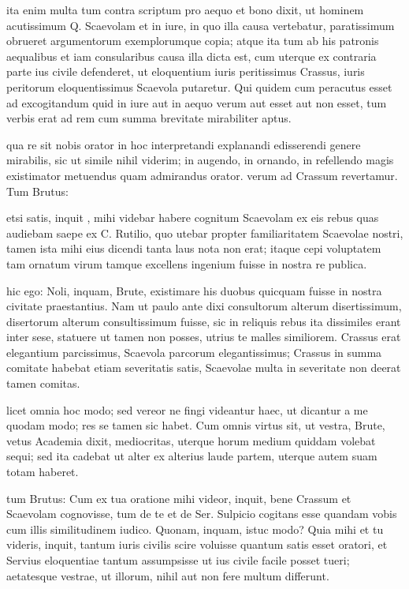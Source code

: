 ita enim multa tum contra scriptum pro aequo et bono dixit, ut hominem acutissimum Q. Scaevolam et in iure, in quo illa causa vertebatur, paratissimum obrueret argumentorum exemplorumque copia; atque ita tum ab his patronis aequalibus et iam consularibus causa illa dicta est, cum uterque ex contraria parte ius civile defenderet, ut eloquentium iuris peritissimus Crassus, iuris peritorum eloquentissimus Scaevola putaretur. Qui quidem cum peracutus esset ad excogitandum quid in iure aut in aequo verum aut esset aut non esset, tum verbis erat ad rem cum summa brevitate mirabiliter aptus.

 qua re sit nobis orator in hoc interpretandi explanandi edisserendi genere mirabilis, sic ut simile nihil viderim; in augendo, in ornando, in refellendo magis existimator metuendus quam admirandus orator. verum ad Crassum revertamur. Tum Brutus:

 etsi satis, inquit , mihi videbar habere cognitum Scaevolam ex eis rebus quas audiebam saepe ex C. Rutilio, quo utebar propter familiaritatem Scaevolae nostri, tamen ista mihi eius dicendi tanta laus nota non erat; itaque cepi voluptatem tam ornatum virum tamque excellens ingenium fuisse in nostra re publica.

 hic ego: Noli, inquam, Brute, existimare his duobus quicquam fuisse in nostra civitate praestantius. Nam ut paulo ante dixi consultorum alterum disertissimum, disertorum alterum consultissimum fuisse, sic in reliquis rebus ita dissimiles erant inter sese, statuere ut tamen non posses, utrius te malles similiorem. Crassus erat elegantium parcissimus, Scaevola parcorum elegantissimus; Crassus in summa comitate habebat etiam severitatis satis, Scaevolae multa in severitate non deerat tamen comitas.

 licet omnia hoc modo; sed vereor ne fingi videantur haec, ut dicantur a me quodam modo; res se tamen sic habet. Cum omnis virtus sit, ut vestra, Brute, vetus Academia dixit, mediocritas, uterque horum medium quiddam volebat sequi; sed ita cadebat ut alter ex alterius laude partem, uterque autem suam totam haberet.

 tum Brutus: Cum ex tua oratione mihi videor, inquit, bene Crassum et Scaevolam cognovisse, tum de te et de Ser. Sulpicio cogitans esse quandam vobis cum illis similitudinem iudico. Quonam, inquam, istuc modo? Quia mihi et tu videris, inquit, tantum iuris civilis scire voluisse quantum satis esset oratori, et Servius eloquentiae tantum assumpsisse ut ius civile facile posset tueri; aetatesque vestrae, ut illorum, nihil aut non fere multum differunt.


